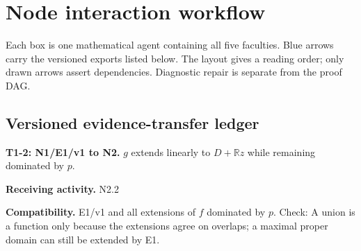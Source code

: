 \documentclass[preprint,12pt,aps,pra,showkeys,amsmath,amssymb,superscriptaddress,floatfix]{revtex4-2}
\theoremstyle{definition}
\theoremstyle{remark}
\newcommand{\field}[2]{\par\smallskip\noindent\textbf{#1.} #2\par}
\begin{document}
\clearpage\section{Node interaction workflow}

\begin{center}\end{center}

Each box is one mathematical agent containing all five faculties. Blue
arrows carry the versioned exports listed below. The layout gives a
reading order; only drawn arrows assert dependencies. Diagnostic repair
is separate from the proof DAG.

\subsection{Versioned evidence-transfer ledger}

\begingroup\small\linespread{1.05}\selectfont

\field{T1-2: N1/E1/v1 to N2}{\(g\) extends linearly to \(D+\mathbb Rz\) while remaining dominated by
\(p\).}

\field{Receiving activity}{N2.2}

\field{Compatibility}{E1/v1 and all extensions of \(f\) dominated by \(p\). Check: A union is
a function only because the extensions agree on overlaps; a maximal
proper domain can still be extended by E1.}
\end{document}
